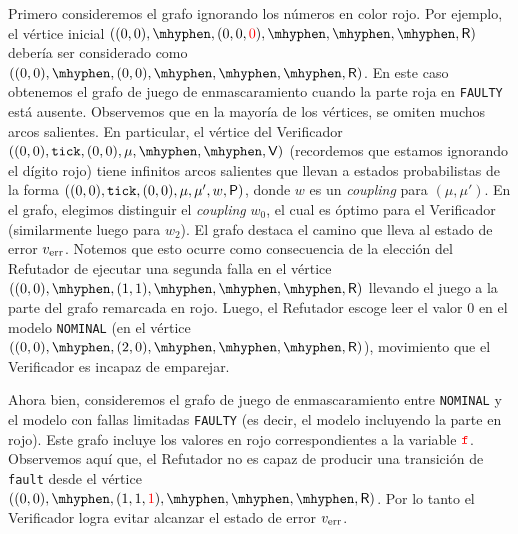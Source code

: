   \noindent%
  Primero consideremos el grafo ignorando los números en color rojo. Por ejemplo, el vértice inicial 
  $\left((0,0),\mhyphen,(0,0,\textcolor{red}{0}),\mhyphen,\mhyphen,\mhyphen,\Refuter\right)$
  debería ser considerado como
  $\left((0,0),\mhyphen,(0,0),\mhyphen,\mhyphen,\mhyphen,\Refuter\right)$.
  En este caso obtenemos el grafo de juego de enmascaramiento cuando la parte roja en
  \texttt{FAULTY} está ausente.
  Observemos que en la mayoría de los vértices, se omiten muchos arcos salientes. En particular, el vértice del Verificador $\left((0,0),\texttt{tick},(0,0),\mu,\mhyphen,\mhyphen,\Verifier\right)$
  (recordemos que estamos ignorando el dígito rojo) tiene infinitos arcos salientes que llevan a estados probabilistas de la forma
  $\left((0,0),\texttt{tick},(0,0),\mu,\mu',w,\mathsf{P}\right)$,
  donde $w$ es un \textit{coupling} para $(\mu,\mu')$.
  En el grafo, elegimos distinguir el \textit{coupling} $w_0$, el cual es óptimo para el Verificador (similarmente luego para $w_2$).
  El grafo destaca el camino que lleva al estado de error $v_{\text{err}}$.
  Notemos que esto ocurre como consecuencia de la elección del Refutador de ejecutar una segunda falla en el vértice
  $\left((0,0),\mhyphen,(1,1),\mhyphen,\mhyphen,\mhyphen,\Refuter\right)$
  llevando el juego a la parte del grafo remarcada en rojo.  Luego, el Refutador escoge leer el valor 0 en el modelo \texttt{NOMINAL}  (en el vértice
  $\left((0,0),\mhyphen,(2,0),\mhyphen,\mhyphen,\mhyphen,\Refuter\right)$),
  movimiento que el Verificador es incapaz de emparejar.
  

  Ahora bien, consideremos el grafo de juego de enmascaramiento entre \texttt{NOMINAL} y
  el modelo con fallas limitadas \texttt{FAULTY} (es decir, el modelo incluyendo la parte en rojo).  Este grafo incluye los valores en rojo correspondientes a la variable $\textcolor{red}{\texttt{f}}$.  Observemos aquí que, el Refutador no es capaz de producir una transición de \texttt{fault} desde el vértice
  $\left((0,0),\mhyphen,(1,1,\textcolor{red}{1}),\mhyphen,\mhyphen,\mhyphen,\Refuter\right)$.
  Por lo tanto el Verificador logra evitar alcanzar el estado de error
  $v_{\text{err}}$.
\medskip\par


